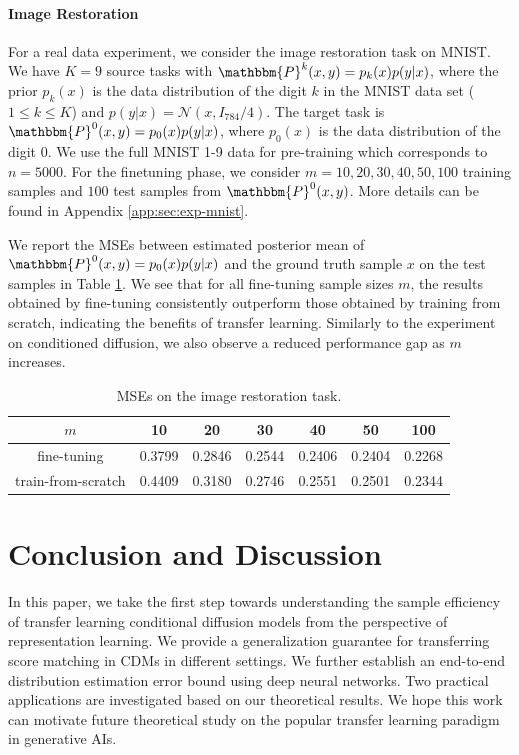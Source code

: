 \documentclass{article}
\numberwithin{equation}{section}
\theoremstyle{definition}
\begin{document}
\paragraph{Image Restoration}
For a real data experiment, we consider the image restoration task on MNIST. 
We have $K=9$ source tasks with $\mathbbm{P}^k(x,y)=p_k(x)p(y|x)$, where the prior $p_k(x)$ is the data distribution of the digit $k$ in the MNIST data set ($1\leq k\leq K$) and $p(y|x)=\mathcal{N}(x,I_{784}/4)$.
The target task is $\mathbbm{P}^0(x,y)=p_0(x)p(y|x)$, where $p_0(x)$ is the data distribution of the digit 0. 
We use the full MNIST 1-9 data for pre-training which corresponds to $n=5000$.
For the finetuning phase, we consider $m=10,20,30,40,50,100$ training samples and $100$ test samples from $\mathbbm{P}^0(x,y)$.
More details can be found in Appendix \ref{app:sec:exp-mnist}.

We report the MSEs between estimated posterior mean of $\mathbbm{P}^0(x,y)=p_0(x)p(y|x)$ and the ground truth sample $x$ on the test samples in Table \ref{tab:mnist}.
We see that for all fine-tuning sample sizes $m$, the results obtained by fine-tuning consistently outperform those obtained by training from scratch, indicating the benefits of transfer learning.
Similarly to the experiment on conditioned diffusion, we also observe a reduced performance gap as $m$ increases.
\begin{table}[t]
\centering
\begin{tabular}{ccccccc}
\toprule
$m$&10&20&30&40&50&100\\
\midrule
fine-tuning&0.3799&0.2846&0.2544&0.2406&0.2404&0.2268\\
train-from-scratch&0.4409&0.3180&0.2746&0.2551&0.2501&0.2344\\
\bottomrule
\end{tabular}
\vspace{0.1cm}
\caption{MSEs on the image restoration task.}
\label{tab:mnist}
\end{table}

\section{Conclusion and Discussion}

In this paper, we take the first step towards understanding the sample efficiency of transfer learning conditional diffusion models from the perspective of representation learning.
We provide a generalization guarantee for transferring score matching in CDMs in different settings.
We further establish an end-to-end distribution estimation error bound using deep neural networks.
Two practical applications are investigated based on our theoretical results.
We hope this work can motivate future theoretical study on the popular transfer learning paradigm in generative AIs.
\end{document}
